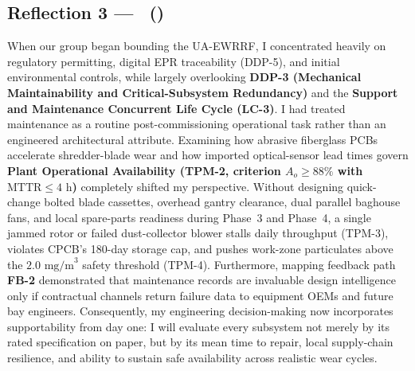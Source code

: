 \subsection{Reflection 3 --- \memberThreeName\ (\texttt{\memberThreeRoll})}
When our group began bounding the UA-EWRRF, I concentrated heavily on regulatory permitting, digital EPR traceability (DDP-5), and initial environmental controls, while largely overlooking \textbf{DDP-3 (Mechanical Maintainability and Critical-Subsystem Redundancy)} and the \textbf{Support and Maintenance Concurrent Life Cycle (LC-3)}. I had treated maintenance as a routine post-commissioning operational task rather than an engineered architectural attribute. Examining how abrasive fiberglass PCBs accelerate shredder-blade wear and how imported optical-sensor lead times govern \textbf{Plant Operational Availability (TPM-2, criterion $A_o \ge 88\%$ with $\text{MTTR} \le 4\text{ h}$)} completely shifted my perspective. Without designing quick-change bolted blade cassettes, overhead gantry clearance, dual parallel baghouse fans, and local spare-parts readiness during Phase~3 and Phase~4, a single jammed rotor or failed dust-collector blower stalls daily throughput (TPM-3), violates CPCB's 180-day storage cap, and pushes work-zone particulates above the $2.0\text{ mg/m}^3$ safety threshold (TPM-4). Furthermore, mapping feedback path \textbf{FB-2} demonstrated that maintenance records are invaluable design intelligence only if contractual channels return failure data to equipment OEMs and future bay engineers. Consequently, my engineering decision-making now incorporates supportability from day one: I will evaluate every subsystem not merely by its rated specification on paper, but by its mean time to repair, local supply-chain resilience, and ability to sustain safe availability across realistic wear cycles.

